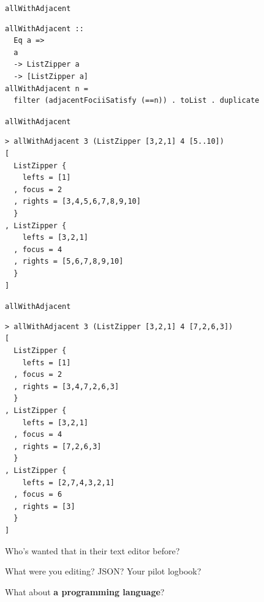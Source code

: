 \begin{frame}[fragile]
\begin{block}{\lstinline{allWithAdjacent}}
\begin{center}
\begin{lstlisting}[style=haskell]
allWithAdjacent ::
  Eq a =>
  a
  -> ListZipper a
  -> [ListZipper a]
allWithAdjacent n =
  filter (adjacentFociiSatisfy (==n)) . toList . duplicate
\end{lstlisting}
\end{center}
\end{block}
\end{frame}

\begin{frame}[fragile]
\begin{block}{\lstinline{allWithAdjacent}}
\begin{center}
\begin{lstlisting}[style=haskell]
> allWithAdjacent 3 (ListZipper [3,2,1] 4 [5..10])
[
  ListZipper {
    lefts = [1]
  , focus = 2
  , rights = [3,4,5,6,7,8,9,10]
  }
, ListZipper {
    lefts = [3,2,1]
  , focus = 4
  , rights = [5,6,7,8,9,10]
  }
]
\end{lstlisting}
\end{center}
\end{block}
\end{frame}

\begin{frame}[fragile]
\begin{block}{\lstinline{allWithAdjacent}}
\begin{center}
\begin{lstlisting}[style=haskell]
> allWithAdjacent 3 (ListZipper [3,2,1] 4 [7,2,6,3])
[
  ListZipper {
    lefts = [1]
  , focus = 2
  , rights = [3,4,7,2,6,3]
  }
, ListZipper {
    lefts = [3,2,1]
  , focus = 4
  , rights = [7,2,6,3]
  }
, ListZipper {
    lefts = [2,7,4,3,2,1]
  , focus = 6
  , rights = [3]
  }
]
\end{lstlisting}
\end{center}
\end{block}
\end{frame}

\begin{frame}
\begin{center}
Who's wanted that in their text editor before?
\end{center}
\end{frame}

\begin{frame}
\begin{center}
What were you editing? JSON? Your pilot logbook?

What about \textbf{a programming language}?
\end{center}
\end{frame}

